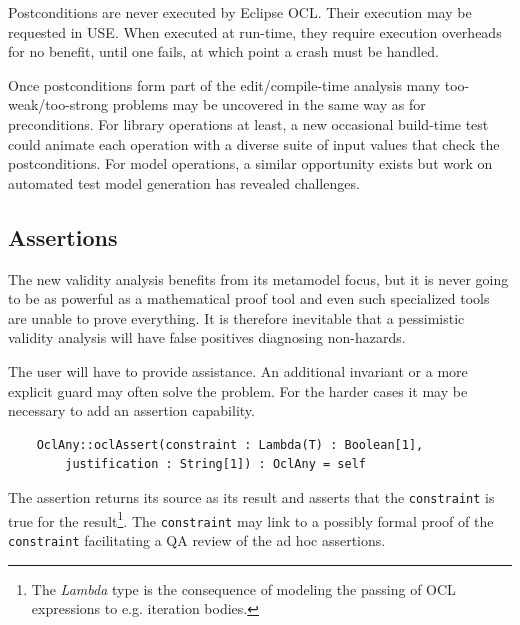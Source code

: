 \documentclass[
]{ceurart}
\begin{document}
Postconditions are never executed by Eclipse OCL. Their execution may be requested in USE. When executed at run-time, they require execution overheads for no benefit, until one fails, at which point a crash must be handled.

Once postconditions form part of the edit/compile-time analysis many too-weak/too-strong problems may be uncovered in the same way as for preconditions. For library operations at least, a new occasional build-time test could animate each operation with a diverse suite of input values that check the postconditions. For model operations, a similar opportunity exists but work on automated test model generation has revealed challenges. 




\subsection{Assertions}

The new validity analysis benefits from its metamodel focus, but it is never going to be as powerful as a mathematical proof tool and even such specialized tools are unable to prove everything. It is therefore inevitable that a pessimistic validity analysis will have false positives diagnosing non-hazards. 

The user will have to provide assistance. An additional invariant or a more explicit guard may often solve the problem. For the harder cases it may be necessary to add an assertion capability.

\begin{verbatim}
    OclAny::oclAssert(constraint : Lambda(T) : Boolean[1],
        justification : String[1]) : OclAny = self
\end{verbatim}

The assertion returns its source as its result and asserts that the \verb|constraint| is true for the result\footnote{The \emph{Lambda} type is the consequence of modeling the passing of OCL expressions to e.g. iteration bodies.}. The \verb|constraint| may link to a possibly formal proof of the \verb|constraint| facilitating a QA review of the ad hoc assertions.
\end{document}
